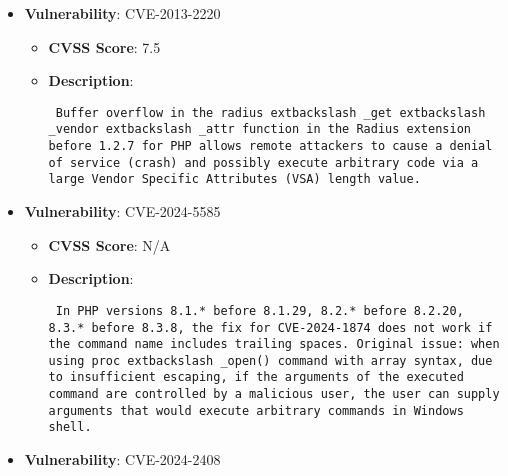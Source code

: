 \documentclass{article}
\begin{document}
\begin{itemize}
\begin{itemize}
{{ }}
        \end{itemize}
    
        \item \textbf{Vulnerability}: CVE-2013-2220
        \begin{itemize}
            \item \textbf{CVSS Score}:  7.5 
            \item \textbf{Description}: \parbox{\linewidth}{\texttt{ Buffer overflow in the radius	extbackslash _get	extbackslash _vendor	extbackslash _attr function in the Radius extension before 1.2.7 for PHP allows remote attackers to cause a denial of service (crash) and possibly execute arbitrary code via a large Vendor Specific Attributes (VSA) length value. }}
        \end{itemize}
    
        \item \textbf{Vulnerability}: CVE-2024-5585
        \begin{itemize}
            \item \textbf{CVSS Score}:  N/A 
            \item \textbf{Description}: \parbox{\linewidth}{\texttt{ In PHP versions 8.1.* before 8.1.29, 8.2.* before 8.2.20, 8.3.* before 8.3.8, the fix for CVE-2024-1874 does not work if the command name includes trailing spaces. Original issue: when using proc	extbackslash _open() command with array syntax, due to insufficient escaping, if the arguments of the executed command are controlled by a malicious user, the user can supply arguments that would execute arbitrary commands in Windows shell. }}
        \end{itemize}
    
        \item \textbf{Vulnerability}: CVE-2024-2408
\end{itemize}
\end{document}
